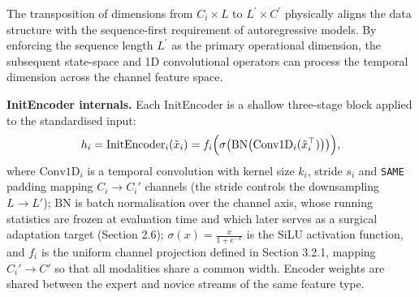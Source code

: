 \documentclass[11pt,a4paper]{article}
\begin{document}
	The transposition of dimensions from $C_i \times L$ to $L^{\prime} \times C^{\prime}$ physically aligns the data structure with the sequence-first requirement of autoregressive models. By enforcing the sequence length $L^{\prime}$ as the primary operational dimension, the subsequent state-space and 1D convolutional operators can process the temporal dimension across the channel feature space.
	
	\textbf{InitEncoder internals.} Each InitEncoder is a shallow three-stage block applied to the standardised input:
	$$h_i = \text{InitEncoder}_i(\tilde{x}_i) = f_i\Bigl(\sigma\bigl(\text{BN}\bigl(\text{Conv1D}_i(\tilde{x}_i^{\top})\bigr)\bigr)\Bigr),$$
	where $\text{Conv1D}_i$ is a temporal convolution with kernel size $k_i$, stride $s_i$ and \texttt{SAME} padding mapping $C_i \to C_i'$ channels (the stride controls the downsampling $L \to L'$); $\text{BN}$ is batch normalisation \cite{ioffe2015batchnorm} over the channel axis, whose running statistics are frozen at evaluation time and which later serves as a surgical adaptation target (Section 2.6); $\sigma(x) = \frac{x}{1 + e^{-x}}$ is the SiLU activation function, and $f_i$ is the uniform channel projection defined in Section 3.2.1, mapping $C_i' \to C'$ so that all modalities share a common width. Encoder weights are shared between the expert and novice streams of the same feature type.
	
\end{document}
